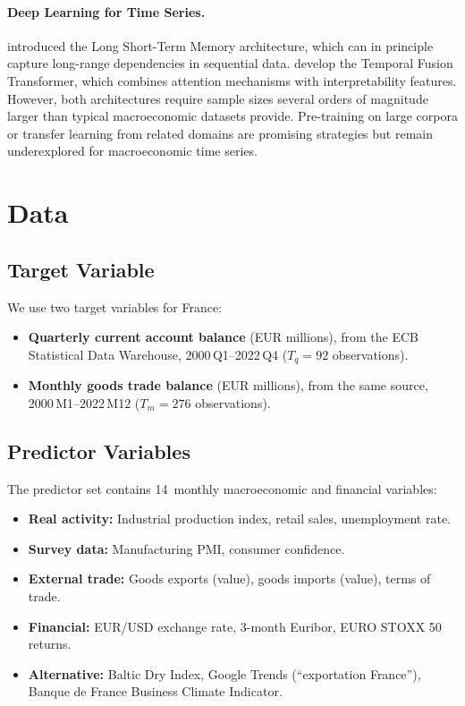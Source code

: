 \paragraph{Deep Learning for Time Series.}
\citet{hochreiter1997long} introduced the Long Short-Term Memory architecture, which can in principle capture long-range dependencies in sequential data.  \citet{lim2021temporal} develop the Temporal Fusion Transformer, which combines attention mechanisms with interpretability features.  However, both architectures require sample sizes several orders of magnitude larger than typical macroeconomic datasets provide.  Pre-training on large corpora \citep{devlin2019bert} or transfer learning from related domains are promising strategies but remain underexplored for macroeconomic time series.


\section{Data}
\label{sec:ch1_data}

\subsection{Target Variable}

We use two target variables for France:
\begin{itemize}
  \item \textbf{Quarterly current account balance} (EUR millions), from the ECB Statistical Data Warehouse, 2000\,Q1--2022\,Q4 ($T_q = 92$ observations).
  \item \textbf{Monthly goods trade balance} (EUR millions), from the same source, 2000\,M1--2022\,M12 ($T_m = 276$ observations).
\end{itemize}

\subsection{Predictor Variables}

The predictor set contains 14~monthly macroeconomic and financial variables:
\begin{itemize}
  \item \textbf{Real activity:} Industrial production index, retail sales, unemployment rate.
  \item \textbf{Survey data:} Manufacturing PMI, consumer confidence.
  \item \textbf{External trade:} Goods exports (value), goods imports (value), terms of trade.
  \item \textbf{Financial:} EUR/USD exchange rate, 3-month Euribor, EURO STOXX 50 returns.
  \item \textbf{Alternative:} Baltic Dry Index, Google Trends (``exportation France''), Banque de France Business Climate Indicator.
\end{itemize}

